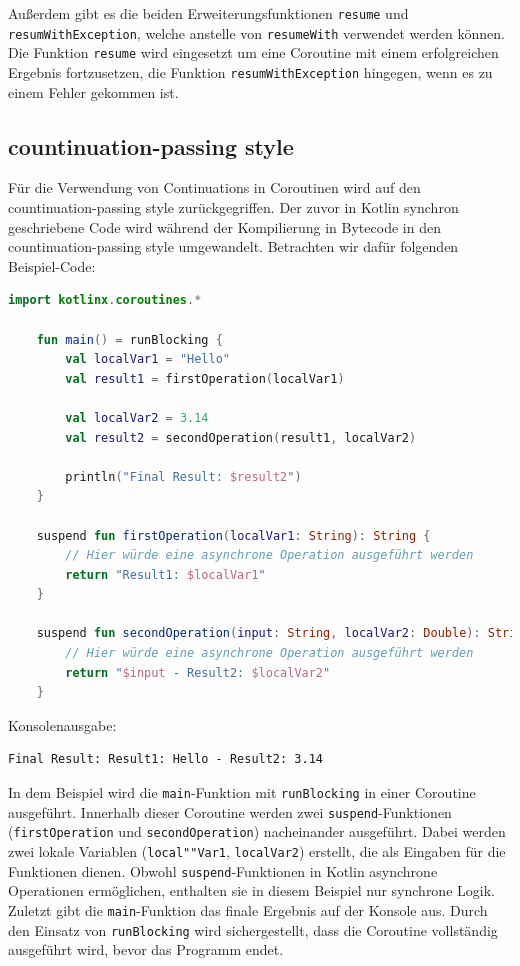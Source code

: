 \documentclass[fontsize=12pt,paper=a4,twoside=semi,parskip=half-,headsepline,headinclude]{scrreprt}
\begin{document}
Außerdem gibt es die beiden Erweiterungsfunktionen \texttt{resume} und \texttt{resumWithException}, welche anstelle von \texttt{resumeWith} verwendet werden können. Die Funktion \texttt{resume} wird eingesetzt um eine Coroutine mit einem erfolgreichen Ergebnis fortzusetzen, die Funktion \texttt{resumWithException} hingegen, wenn es zu einem Fehler gekommen ist.


\subsection{countinuation-passing style}
\label{subsec:csp}

Für die Verwendung von Continuations in Coroutinen wird auf den countinuation-passing style\cite{sus75} zurückgegriffen. Der zuvor in Kotlin synchron geschriebene Code wird während der Kompilierung in Bytecode in den countinuation-passing style umgewandelt\cite{Elizarov2017b}. Betrachten wir dafür folgenden Beispiel-Code:

\begin{lstlisting}[language=Kotlin]
	import kotlinx.coroutines.*

	fun main() = runBlocking {
		val localVar1 = "Hello"
		val result1 = firstOperation(localVar1)
	
		val localVar2 = 3.14
		val result2 = secondOperation(result1, localVar2)
	
		println("Final Result: $result2")
	}

	suspend fun firstOperation(localVar1: String): String {
		// Hier würde eine asynchrone Operation ausgeführt werden
		return "Result1: $localVar1"
	}

	suspend fun secondOperation(input: String, localVar2: Double): String {
		// Hier würde eine asynchrone Operation ausgeführt werden
		return "$input - Result2: $localVar2"
	}
\end{lstlisting}
Konsolenausgabe:
\begin{lstlisting}[frame=shadowbox, rulecolor=\color{black}, backgroundcolor=\color{gray!10}]
	Final Result: Result1: Hello - Result2: 3.14
\end{lstlisting}

In dem Beispiel wird die \texttt{main}-Funktion mit \texttt{runBlocking} in einer Coroutine ausgeführt. Innerhalb dieser Coroutine werden zwei \texttt{suspend}-Funktionen (\texttt{firstOperation} und \texttt{secondOperation}) nacheinander ausgeführt. Dabei werden zwei lokale Variablen (\texttt{local""Var1}, \texttt{localVar2}) erstellt, die als Eingaben für die Funktionen dienen. Obwohl \texttt{suspend}-Funktionen in Kotlin asynchrone Operationen ermöglichen, enthalten sie in diesem Beispiel nur synchrone Logik. Zuletzt gibt die \texttt{main}-Funktion das finale Ergebnis auf der Konsole aus. Durch den Einsatz von \texttt{runBlocking} wird sichergestellt, dass die Coroutine vollständig ausgeführt wird, bevor das Programm endet.
\end{document}
